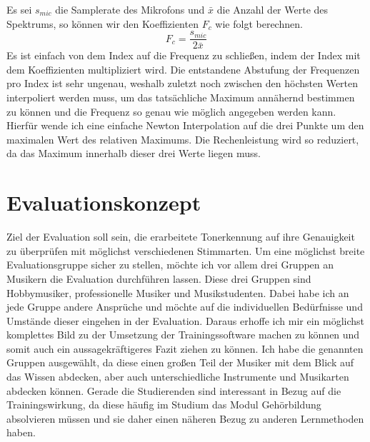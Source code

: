 Es sei $s_{mic}$ die Samplerate des Mikrofons und $\bar{x}$ die Anzahl der Werte des Spektrums, so können wir den Koeffizienten $F_c$ wie folgt berechnen.
$$ F_c = \frac{s_{mic}}{2\bar{x}} $$
Es ist einfach von dem Index auf die Frequenz zu schließen, indem der Index mit dem Koeffizienten multipliziert wird. Die entstandene Abstufung der Frequenzen pro Index ist sehr ungenau, weshalb zuletzt noch zwischen den höchsten Werten interpoliert werden muss, um das tatsächliche Maximum annähernd bestimmen zu können und die Frequenz so genau wie möglich angegeben werden kann. Hierfür wende ich eine einfache Newton Interpolation auf die drei Punkte um den maximalen Wert des relativen Maximums. Die Rechenleistung wird so reduziert, da das Maximum innerhalb dieser drei Werte liegen muss. 

\section{Evaluationskonzept}
Ziel der Evaluation soll sein, die erarbeitete Tonerkennung auf ihre Genauigkeit zu überprüfen mit möglichst verschiedenen Stimmarten. Um eine möglichst breite Evaluationsgruppe sicher zu stellen, möchte ich vor allem drei Gruppen an Musikern die Evaluation durchführen lassen. Diese drei Gruppen sind Hobbymusiker, professionelle Musiker und Musikstudenten. Dabei habe ich an jede Gruppe andere Ansprüche und möchte auf die individuellen Bedürfnisse und Umstände dieser eingehen in der Evaluation. Daraus erhoffe ich mir ein möglichst komplettes Bild zu der Umsetzung der Trainingssoftware machen zu können und somit auch ein aussagekräftigeres Fazit ziehen zu können.
Ich habe die genannten Gruppen ausgewählt, da diese einen großen Teil der Musiker mit dem Blick auf das Wissen abdecken, aber auch unterschiedliche Instrumente und Musikarten abdecken können. Gerade die Studierenden sind interessant in Bezug auf die Trainingswirkung, da diese häufig im Studium das Modul Gehörbildung absolvieren müssen und sie daher einen näheren Bezug zu anderen Lernmethoden haben. \\
